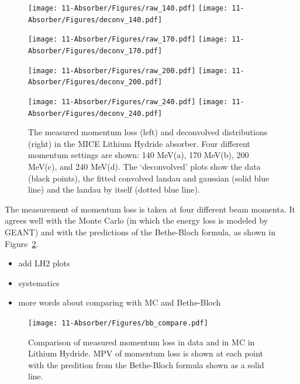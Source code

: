 \begin{figure}
\texttt{[image: 11-Absorber/Figures/raw\_140.pdf]}\hfil
\texttt{[image: 11-Absorber/Figures/deconv\_140.pdf]}
\vspace{-5cm}

\texttt{[image: 11-Absorber/Figures/raw\_170.pdf]}\hfil
\texttt{[image: 11-Absorber/Figures/deconv\_170.pdf]}
\vspace{-5cm}

\texttt{[image: 11-Absorber/Figures/raw\_200.pdf]}\hfil
\texttt{[image: 11-Absorber/Figures/deconv\_200.pdf]}
\vspace{-5cm}

\texttt{[image: 11-Absorber/Figures/raw\_240.pdf]}\hfil
\texttt{[image: 11-Absorber/Figures/deconv\_240.pdf]}
\caption{\label{fig:eloss_data} The measured momentum loss (left) and deconvolved distributions (right) in the MICE Lithium Hydride absorber.  Four different momentum settings are shown: 140 MeV(a), 170 MeV(b), 200 MeV(c), and 240 MeV(d).  The `deconvolved' plots show the data (black points), the fitted convolved landau and gaussian (solid blue line) and the landau by itself (dotted blue line).}
\end{figure}

The measurement of momentum loss is taken at four different beam momenta.  It agrees well with the Monte Carlo (in which the energy loss is modeled by GEANT) and with the predictions of the Bethe-Bloch formula, as shown in Figure~\ref{fig:eloss_bb}.

{\color{red}
\begin{itemize}
\item add LH2 plots
\item systematics
\item more words about comparing with MC and Bethe-Bloch
\end{itemize}
}

\begin{figure}
\hfil\texttt{[image: 11-Absorber/Figures/bb\_compare.pdf]}\hfil

\caption{\label{fig:eloss_bb} Comparison of measured momentum loss in data and in MC in Lithium Hydride.  MPV of momentum loss is shown at each point with the predition from the Bethe-Bloch formula shown as a solid line.}
\end{figure}


